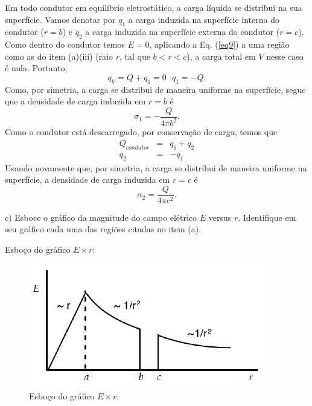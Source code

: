 \begin{enumerate}[start=1,label={\bfseries Q\arabic*.}]
\resposta Em todo condutor em equilíbrio eletrostático, a carga líquida se distribui na sua superfície. Vamos denotar por $q_{1}$ a carga induzida na superfície interna do condutor ($r = b$) e $q_{2}$ a carga induzida na superfície externa do condutor ($r = c$). Como dentro do condutor temos $E = 0$, aplicando a Eq. (\ref{eq9}) a uma região como as do item (a)(iii) (raio $r$, tal que $b < r < c$), a carga total em $V$ nesse caso é nula. Portanto,
%
\begin{equation}
  q_{V} = Q + q_{1} = 0 \ \ \ q_{1} = - Q .
\end{equation}
%
Como, por simetria, a carga se distribui de maneira uniforme na superfície, segue que a densidade de carga induzida em $r = b$ é
%
\begin{equation}
  \sigma_{1} = - \frac{Q}{ 4 \pi b^{2} } .
\end{equation}
%
Como o condutor está descarregado, por conservação de carga, temos que
%
\begin{equation}
  \begin{array}{ccc}
    Q_{condutor} & = & q_{1} + q_{2} \\
    q_{2} & = & - q_{1}
  \end{array}
\end{equation}
%
Usando novamente que, por simetria, a carga se distribui de maneira uniforme na superfície, a densidade de carga induzida em $r = c$ é
\begin{equation}
  \sigma_{2} = \frac{Q}{4 \pi c^{2}} .
\end{equation}



c) Esboce o gráfico da magnitude do campo elétrico $E$ versus $r$. Identifique em seu gráfico cada uma das regiões citadas no item (a).

\resposta Esboço do gráfico $E \times r$:
%
\begin{figure}[H]
  \centering
  \includegraphics[scale=1]{eletromag-img/esboco.png}
  \caption{Esboço do gráfico $E \times r$.}\label{esbocopng}
\end{figure}
%






\end{enumerate}
